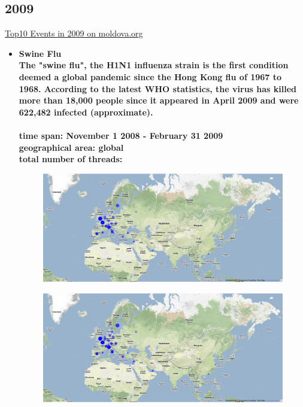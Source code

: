 \documentclass[11pt,a4paper,english]{article}
\begin{document}
			\subsection{2009}
			\href{http://social.moldova.org/news/10-most-important-world-events-of-2009-217390-eng.html}{Top10 Events in 2009 on moldova.org}
				\begin{itemize}
					\item \bf Swine Flu \rm
						\\ The "swine flu", the H1N1 influenza strain is the first condition deemed a global pandemic since the Hong Kong flu of 1967 to 1968. According to the latest WHO statistics, the virus has killed more than 18,000 people since it appeared in April 2009 and were 622,482 infected (approximate).
						\\\\ \bf time span: \rm November 1 2008 - February 31 2009
						\\ \bf geographical area: \rm global 
						\\ \bf total number of threads: \rm
						\begin{figure}[H]
							\vspace{-5pt}
  							\begin{center}
								\includegraphics[width=130mm]{img/pre-birdflu}
							\end{center}
							\vspace{-13pt}
						\end{figure}
						\begin{figure}[H]
							\vspace{-13pt}
	  						\begin{center}
								\includegraphics[width=130mm]{img/post-birdflu}

\end{center}
\end{figure}
\end{itemize}
\end{document}
